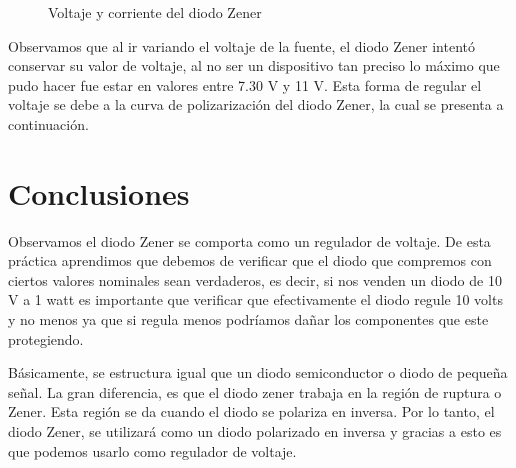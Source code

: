\documentclass{mylib/reporteConCalif}
\begin{document}
\begin{figure}[H]%
    \centering
    \qquad
    \caption{Voltaje y corriente del diodo Zener}%
    \label{fig:example}%
\end{figure}

Observamos que al ir variando el voltaje de la fuente, el diodo Zener intentó conservar su valor de voltaje, al no ser un dispositivo tan preciso lo máximo que pudo hacer fue estar en valores entre 7.30 V y 11 V.
Esta forma de regular el voltaje se debe a la curva de polizarización del diodo Zener, la cual se presenta a continuación.


\section{Conclusiones}

Observamos el diodo Zener se comporta como un regulador de voltaje. De esta práctica aprendimos que debemos de verificar que el diodo que compremos con ciertos valores nominales sean verdaderos, es decir, si nos venden un diodo de 10 V a 1 watt es importante que verificar que efectivamente el diodo regule 10 volts y no menos ya que si regula menos podríamos dañar los componentes que este protegiendo.

Básicamente, se estructura igual que un diodo semiconductor o diodo de pequeña señal. La gran diferencia, es que el diodo zener trabaja en la región de ruptura o Zener. Esta región se da cuando el diodo se polariza en inversa. Por lo tanto, el diodo Zener, se utilizará como un diodo polarizado en inversa y gracias a esto es que podemos usarlo como regulador de voltaje.
\end{document}
